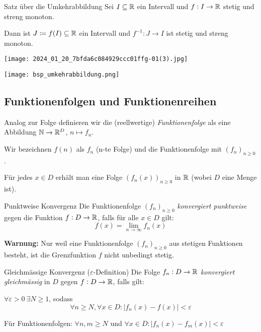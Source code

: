 \begin{lemma}{Satz über die Umkehrabbildung}
    Sei $I \subseteq \mathbb{R}$ ein Intervall und $f:I \to \mathbb{R}$ stetig und streng monoton.

    Dann ist $J \coloneqq f(I) \subseteq \mathbb{R}$ ein Intervall und $f^{-1}: J \to I$ ist stetig und streng monoton.
\end{lemma}

\begin{center}
    \texttt{[image: 2024\_01\_20\_7bfda6c084929ccc01ffg-01(3).jpg]}
\end{center}

\begin{example}
    \texttt{[image: bsp\_umkehrabbildung.png]}
\end{example}

\subsection{Funktionenfolgen und Funktionenreihen}

Analog zur Folge definieren wir die (reellwertige) \textit{Funktionenfolge} als eine Abbildung $\mathbb{N} \to \mathbb{R}^D$, $n \mapsto f_n$.

Wir bezeichnen $f(n)$ als $f_n$ (n-te Folge) und die Funktionenfolge mit $(f_n)_{n\geq 0}$.

Für jedes $x \in D$ erhält man eine Folge $(f_n(x))_{n \geq 0}$ in $\mathbb{R}$ (wobei $D$ eine Menge ist).

\begin{definition}{Punktweise Konvergenz}
    Die Funktionenfolge $(f_n)_{n\geq 0}$ \emph{konvergiert punktweise} gegen die Funktion $f:D \to \mathbb{R}$, falls für alle $x \in D$ gilt:
    $$f(x) = \lim_{n \to \infty} f_n(x)$$
\end{definition}

\textbf{Warnung:} Nur weil eine Funktionenfolge $(f_n)_{n\geq 0}$ aus stetigen Funktionen besteht, ist die Grenzfunktion $f$ nicht unbedingt stetig.

\begin{definition}{Gleichmässige Konvergenz ($\varepsilon$-Definition)}
    Die Folge $f_n : D \to \mathbb{R}$ \emph{konvergiert gleichmässig} in $D$ gegen $f: D \to \mathbb{R}$, falls gilt:

    $\forall \varepsilon > 0~\exists N \geq 1$, sodass
    \begin{equation*}
        \forall n \geq N, \forall x \in D: |f_n(x) - f(x)| < \varepsilon
    \end{equation*}

    Für Funktionenfolgen: $\forall n,m \geq N$ und $\forall x \in D: |f_n(x) - f_m(x)| < \varepsilon$
\end{definition}

